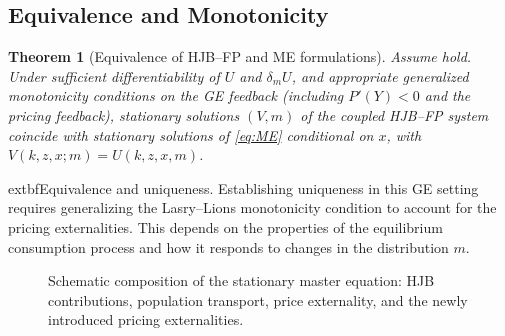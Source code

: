 \documentclass[11pt,letterpaper,oneside]{article}
\providecommand{\ac}[1]{#1}%
\newtheorem{theoremT}{Theorem}
\newenvironment{theorem}[2]{\begin{theoremT}[#1]\label{thm:#2}}{\end{theoremT}}
\newcommand{\LxQ}{\mathcal{L}_x^{\mathbb{Q}}}
\newcommand{\dmU}{\delta_m U}
\begin{document}
\subsection{Equivalence and Monotonicity}

\begin{theorem}{Equivalence of HJB--FP and ME formulations}{equivalence}
Assume  hold. Under sufficient differentiability of $U$ and $\dmU$, and appropriate generalized monotonicity conditions on the GE feedback (including $P'(Y)<0$ and the pricing feedback), stationary solutions $(V,m)$ of the coupled \ac{HJB}--\ac{FP} system coincide with stationary solutions of \eqref{eq:ME} conditional on $x$, with $V(k,z,x;m)=U(k,z,x,m)$.
\end{theorem}

\begin{tcolorbox}[literaturestyle]
	extbf{Equivalence and uniqueness.} Establishing uniqueness in this GE setting requires generalizing the Lasry--Lions monotonicity condition to account for the pricing externalities. This depends on the properties of the equilibrium consumption process and how it responds to changes in the distribution $m$.
\end{tcolorbox}

\begin{figure}[ht]
\centering
{}
\caption{Schematic composition of the stationary master equation: HJB contributions, population transport, price externality, and the newly introduced pricing externalities.}
\end{figure}
\end{document}
